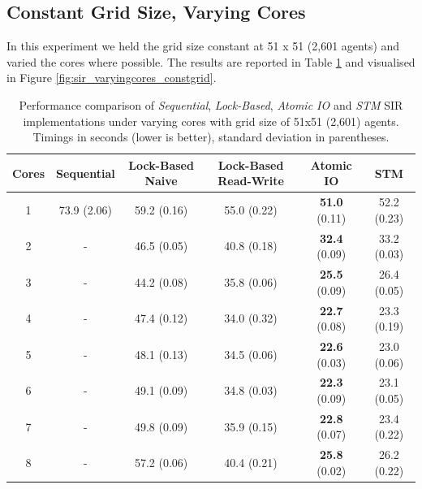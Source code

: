 \subsection{Constant Grid Size, Varying Cores}
In this experiment we held the grid size constant at 51 x 51 (2,601 agents) and varied the cores where possible. The results are reported in Table \ref{tab:sir_varyingcores_constgrid} and visualised in Figure \ref{fig:sir_varyingcores_constgrid}.

\begin{table}
	\centering
	\begin{adjustbox}{width=1\textwidth}
  	\begin{tabular}{ c || c | c | c | c | c }
        Cores & Sequential  & Lock-Based Naive & Lock-Based Read-Write & Atomic IO             & STM          \\ \hline \hline 
   		1     & 73.9 (2.06) & 59.2 (0.16)      & 55.0 (0.22)           & \textbf{51.0} (0.11)  & 52.2 (0.23)  \\ \hline
   		2     & -           & 46.5 (0.05)      & 40.8 (0.18)           & \textbf{32.4} (0.09)  & 33.2 (0.03)  \\ \hline
   		3     & -           & 44.2 (0.08)      & 35.8 (0.06)           & \textbf{25.5} (0.09)  & 26.4 (0.05)  \\ \hline
   		4     & -           & 47.4 (0.12)      & 34.0 (0.32)           & \textbf{22.7} (0.08)  & 23.3 (0.19)  \\ \hline
   		5     & -           & 48.1 (0.13)      & 34.5 (0.06)           & \textbf{22.6} (0.03)  & 23.0 (0.06)  \\ \hline
   		6     & -           & 49.1 (0.09)      & 34.8 (0.03)           & \textbf{22.3} (0.09)  & 23.1 (0.05)  \\ \hline
   		7     & -           & 49.8 (0.09)      & 35.9 (0.15)           & \textbf{22.8} (0.07)  & 23.4 (0.22)  \\ \hline
   		8     & -           & 57.2 (0.06)      & 40.4 (0.21)           & \textbf{25.8} (0.02)  & 26.2 (0.22)  \\ \hline \hline
  	\end{tabular}
	\end{adjustbox}
	
  	\caption[Performance comparison of \textit{Sequential}, \textit{Lock-Based}, \textit{Atomic IO} and \textit{STM} SIR implementations under varying cores with grid size of 51x51 (2,601) agents]{Performance comparison of \textit{Sequential}, \textit{Lock-Based}, \textit{Atomic IO} and \textit{STM} SIR implementations under varying cores with grid size of 51x51 (2,601) agents. Timings in seconds (lower is better), standard deviation in parentheses.}
	\label{tab:sir_varyingcores_constgrid}
\end{table}

